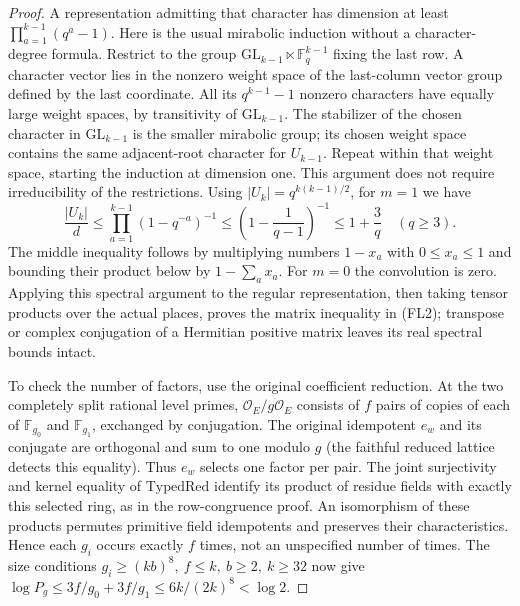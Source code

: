 \begin{proof}
A representation admitting that character has dimension at least
\(\prod_{a=1}^{k-1}(q^a-1)\). Here is the usual mirabolic induction
without a character-degree formula. Restrict to the group
\(\mathrm{GL}_{k-1}\ltimes\mathbb F_q^{k-1}\) fixing the last
row. A character vector lies in the nonzero weight space of the
last-column vector group defined by the last coordinate. All its
\(q^{k-1}-1\) nonzero characters have equally large weight spaces,
by transitivity of \(\mathrm{GL}_{k-1}\). The stabilizer of the
chosen character in \(\mathrm{GL}_{k-1}\) is the smaller
mirabolic group; its chosen weight space contains the same
adjacent-root character for \(U_{k-1}\). Repeat within that
weight space, starting the induction at dimension one. This
argument does not require irreducibility of the restrictions.
Using \(|U_k|=q^{k(k-1)/2}\), for \(m=1\) we have
\[
 \frac{|U_k|}{d}\le
 \prod_{a=1}^{k-1}(1-q^{-a})^{-1}
 \le \left(1-\frac1{q-1}\right)^{-1}
 \le 1+\frac3q\quad(q\ge3).
\]
The middle inequality follows by multiplying numbers \(1-x_a\)
with \(0\le x_a\le1\) and bounding their product below by
\(1-\sum_a x_a\). For \(m=0\) the convolution is zero.
Applying this spectral argument to the regular representation,
then taking tensor products over the actual places, proves the
matrix inequality in (FL2); transpose or complex conjugation of a
Hermitian positive matrix leaves its real spectral bounds intact.

To check the number of factors, use the original coefficient
reduction. At the two completely split rational level primes,
\(\mathcal O_E/g\mathcal O_E\) consists of \(f\) pairs of copies
of each of \(\mathbb F_{g_0}\) and \(\mathbb F_{g_1}\),
exchanged by conjugation. The original idempotent \(e_w\) and
its conjugate are orthogonal and sum to one modulo \(g\)
(the faithful reduced lattice detects this equality).
Thus \(e_w\) selects one factor per pair. The joint surjectivity
and kernel equality of \(\mathrm{TypedRed}\) identify its
product of residue fields with exactly this selected ring, as
in the row-congruence proof. An isomorphism of these products
permutes primitive field idempotents and preserves their
characteristics. Hence each \(g_i\) occurs exactly \(f\) times,
not an unspecified number of times. The size conditions
\(g_i\ge(kb)^8,\ f\le k,\ b\ge2,\ k\ge32\) now give
\(\log P_g\le3f/g_0+3f/g_1\le6k/(2k)^8<\log2\).
\end{proof}

